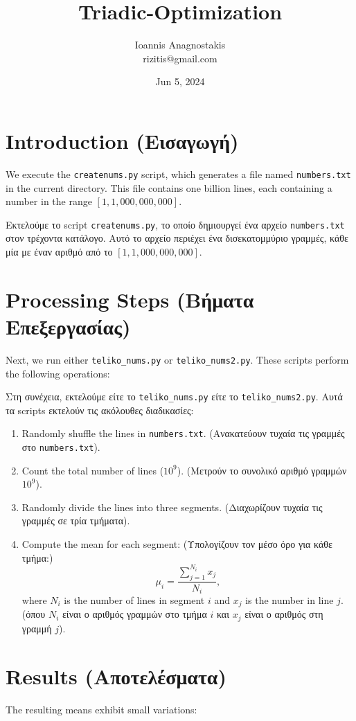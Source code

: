 \documentclass[a4paper,11pt]{article}
\title{Triadic-Optimization}
\author{Ioannis Anagnostakis \\
rizitis@gmail.com}
\date{Jun 5, 2024}
\begin{document}
\maketitle
\section{Introduction (Εισαγωγή)}
We execute the \texttt{createnums.py} script, which generates a file named \texttt{numbers.txt} in the current directory. This file contains one billion lines, each containing a number in the range $[1,1,000,000,000]$.

Εκτελούμε το script \texttt{createnums.py}, το οποίο δημιουργεί ένα αρχείο \texttt{numbers.txt} στον τρέχοντα κατάλογο. Αυτό το αρχείο περιέχει ένα δισεκατομμύριο γραμμές, κάθε μία με έναν αριθμό από το $[1,1,000,000,000]$.

\section{Processing Steps (Βήματα Επεξεργασίας)}
Next, we run either \texttt{teliko\_nums.py} or \texttt{teliko\_nums2.py}. These scripts perform the following operations:

Στη συνέχεια, εκτελούμε είτε το \texttt{teliko\_nums.py} είτε το \texttt{teliko\_nums2.py}. Αυτά τα scripts εκτελούν τις ακόλουθες διαδικασίες:

\begin{enumerate}
    \item Randomly shuffle the lines in \texttt{numbers.txt}. (Ανακατεύουν τυχαία τις γραμμές στο \texttt{numbers.txt}).
    \item Count the total number of lines ($10^9$). (Μετρούν το συνολικό αριθμό γραμμών $10^9$).
    \item Randomly divide the lines into three segments. (Διαχωρίζουν τυχαία τις γραμμές σε τρία τμήματα).
    \item Compute the mean for each segment: (Υπολογίζουν τον μέσο όρο για κάθε τμήμα:)
    \begin{equation}
        \mu_i = \frac{\sum_{j=1}^{N_i} x_j}{N_i},
    \end{equation}
    where $N_i$ is the number of lines in segment $i$ and $x_j$ is the number in line $j$. (όπου $N_i$ είναι ο αριθμός γραμμών στο τμήμα $i$ και $x_j$ είναι ο αριθμός στη γραμμή $j$).
\end{enumerate}

\section{Results (Αποτελέσματα)}
The resulting means exhibit small variations:
\end{document}
